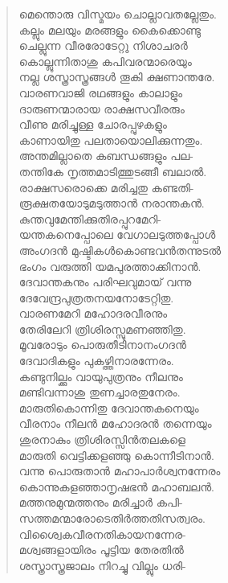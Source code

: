 \begin{verse}
മെന്തൊരു വിസ്മയം ചൊല്ലാവതല്ലേതും.\\
കല്ലും മലയും മരങ്ങളും കൈക്കൊണ്ടു\\
ചെല്ലുന്ന വീരരോടേറ്റു നിശാചരര്‍\\
കൊല്ലുന്നിതാശു കപിവരന്മാരെയും\\
നല്ല ശസ്ത്രാസ്ത്രങ്ങള്‍ തൂകി ക്ഷണാന്തരേ.\\
വാരണവാജി രഥങ്ങളും കാലാളും\\
ദാരുണന്മാരായ രാക്ഷസവീരരും\\
വീണു മരിച്ചുള്ള ചോരപ്പുഴകളും\\
കാണായിതു പലതായൊലിക്കുന്നതും.\\
അന്തമില്ലാതെ കബന്ധങ്ങളും പല-\\
തന്തികേ നൃത്തമാടിത്തുടങ്ങീ ബലാല്‍.\\
രാക്ഷസരൊക്കെ മരിച്ചതു കണ്ടതി-\\
രൂക്ഷതയോടുമടുത്താന്‍ നരാന്തകന്‍.\\
കുന്തവുമേന്തിക്കുതിരപ്പുറമേറി-\\
യന്തകനെപ്പോലെ വേഗാലടുത്തപ്പോള്‍\\
അംഗദന്‍ മുഷ്ടികള്‍കൊണ്ടവന്‍തന്നുടല്‍\\
ഭംഗം വരുത്തി യമപുരത്താക്കിനാന്‍.\\
ദേവാന്തകനും പരിഘവുമായ് വന്നു\\
ദേവേന്ദ്രപുത്രതനയനോടേറ്റിതു.\\
വാരണമേറി മഹോദരവീരനും\\
തേരിലേറി ത്രിശിരസ്സുമണഞ്ഞിതു.\\
മൂവരോടും പൊരുതീടിനാനംഗദന്‍\\
ദേവാദികളും പുകഴ്ത്തിനാരന്നേരം.\\
കണ്ടുനില്ക്കും വായുപുത്രനും നീലനും\\
മണ്ടിവന്നാശു തുണച്ചാരതുനേരം.\\
മാരുതികൊന്നിതു ദേവാന്തകനെയും\\
വീരനാം നീലന്‍ മഹോദരന്‍ തന്നെയും\\
ശുരനാകും ത്രിശിരസ്സിന്‍തലകളെ\\
മാരുതി വെട്ടിക്കളഞ്ഞു കൊന്നീടിനാന്‍.\\
വന്നു പൊരുതാന്‍ മഹാപാര്‍ശ്വനന്നേരം\\
കൊന്നുകളഞ്ഞാനൃഷഭന്‍ മഹാബലന്‍.\\
മത്തനുമുന്മത്തനും മരിച്ചാര്‍ കപി-\\
സത്തമന്മാരോടെതിര്‍ത്തതിസത്വരം.\\
വിശ്വൈകവീരനതികായനന്നേര-\\
മശ്വങ്ങളായിരം പൂട്ടിയ തേരതില്‍\\
ശസ്ത്രാസ്ത്രജാലം നിറച്ചു വില്ലും ധരി-\\

\end{verse}

